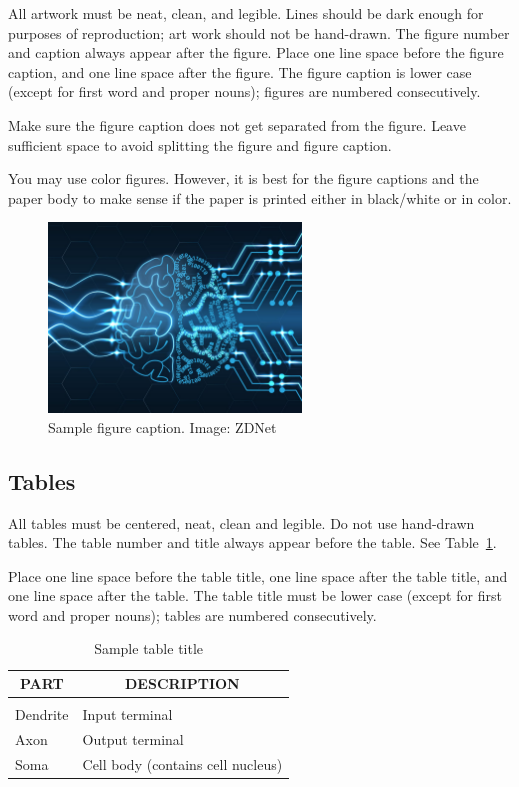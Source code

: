\documentclass{article} %
\begin{document}
All artwork must be neat, clean, and legible. Lines should be dark
enough for purposes of reproduction; art work should not be
hand-drawn. The figure number and caption always appear after the
figure. Place one line space before the figure caption, and one line
space after the figure. The figure caption is lower case (except for
first word and proper nouns); figures are numbered consecutively.

Make sure the figure caption does not get separated from the figure.
Leave sufficient space to avoid splitting the figure and figure caption.

You may use color figures.
However, it is best for the
figure captions and the paper body to make sense if the paper is printed
either in black/white or in color.

\begin{figure}[h]
\begin{center}
\includegraphics[width=0.6\textwidth]{Figs/td-deep-learning.jpg}
\end{center}
\caption{Sample figure caption. Image: ZDNet}
\end{figure}

\subsection{Tables}

All tables must be centered, neat, clean and legible. Do not use hand-drawn
tables. The table number and title always appear before the table. See
Table~\ref{sample-table}.

Place one line space before the table title, one line space after the table
title, and one line space after the table. The table title must be lower case
(except for first word and proper nouns); tables are numbered consecutively.

\begin{table}[t]
\caption{Sample table title}
\label{sample-table}
\begin{center}
\begin{tabular}{ll}
\multicolumn{1}{c}{\bf PART}  &\multicolumn{1}{c}{\bf DESCRIPTION}
\\ \hline \\
Dendrite         &Input terminal \\
Axon             &Output terminal \\
Soma             &Cell body (contains cell nucleus) \\
\end{tabular}
\end{center}
\end{table}
\end{document}
